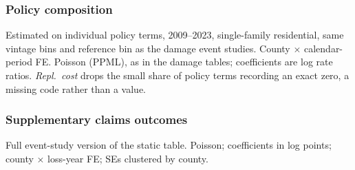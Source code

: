 \documentclass[11pt,xcolor={dvipsnames},hyperref={pdftex,pdfpagemode=UseNone,hidelinks,pdfdisplaydoctitle=true},usepdftitle=false,aspectratio=169]{beamer}
\begin{document}
\begin{frame}\label{frame:composition-table}
    \frametitle{Policy composition}

    \vspace{-0.5em}

    \tiny{
        \begin{table}
        \centering
        \resizebox{.74\linewidth}{!}{}
        \end{table}
    }

    \vspace{0.2em}

    \tiny{Estimated on individual policy terms, 2009--2023, single-family residential, same vintage bins and reference bin as the damage event studies. County $\times$ calendar-period FE. Poisson (PPML), as in the damage tables; coefficients are log rate ratios. \emph{Repl.\ cost} drops the small share of policy terms recording an exact zero, a missing code rather than a value.}

    \vfill

    \hfill \hyperlink{frame:composition}{}
\end{frame}

\begin{frame}\label{frame:supp-outcomes}
    \frametitle{Supplementary claims outcomes}

    \vspace{-0.5em}

    \tiny{
        \begin{table}
        \centering
        \resizebox{.74\linewidth}{!}{}
        \end{table}
    }

    \vspace{0.2em}

    \tiny{Full event-study version of the static table. Poisson; coefficients in log points; county $\times$ loss-year FE; SEs clustered by county.}

    \vfill

    \hfill \hyperlink{frame:robustness}{}
\end{frame}
\end{document}

